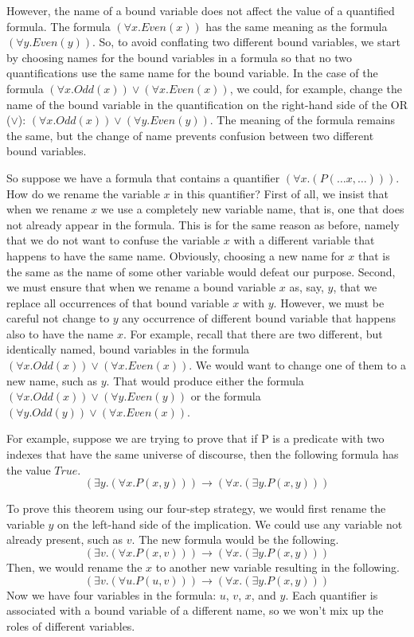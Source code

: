 {However, the name of a bound variable does not affect the value
of a quantified formula.
The formula $(\forall x.Even(x))$ has the same meaning
as the formula $(\forall y.Even(y))$.
So, to avoid conflating two different bound variables,
we start by choosing names for the bound variables in a formula
so that no two quantifications use the same name for the bound variable.
In the case of the formula
$(\forall x.Odd(x)) \vee (\forall x.Even(x))$,
we could, for example, change the name of the bound variable
in the quantification on the right-hand side of the OR ($\vee$):
$(\forall x.Odd(x)) \vee (\forall y.Even(y))$.
The meaning of the formula remains the same,
but the change of name prevents confusion between two different bound variables.

So suppose we have a formula that contains
a quantifier $(\forall x.(P(\dots x, \dots)))$.
How do we rename the variable $x$ in this quantifier?
First of all, we insist that when we rename $x$ we use a completely new variable name,
that is, one that does
not already appear in the formula.
This is for the same reason as before, namely that we do not want to confuse the variable
$x$ with a different variable that happens to have the same name.
Obviously, choosing a new name for $x$ that is the same as the name
of some other variable would defeat our purpose.
Second, we must ensure that when we rename a bound variable $x$ as, say,
$y$, that we replace all occurrences of that bound variable $x$ with $y$.
However, we must be careful not change to $y$ any occurrence of different bound variable
that happens also to have the name $x$.
For example, recall that there are two different, but identically named,
bound variables in the formula
$(\forall x.Odd(x)) \vee (\forall x.Even(x))$.
We would want to change one of them to a new name, such as $y$.
That would produce either the formula
$(\forall x.Odd(x)) \vee (\forall y.Even(y))$ or the formula
$(\forall y.Odd(y)) \vee (\forall x.Even(x))$.

For example, suppose we are trying to prove that
if P is a predicate with two indexes
that have the same universe of discourse,
then the following formula has the value $True$.
$$(\exists y. (\forall x. P(x, y))) \rightarrow (\forall x. (\exists y. P(x, y)))$$

To prove this theorem using our four-step strategy,
we would first rename the variable $y$ on the left-hand side of the implication.
We could use any variable not already present, such as $v$.
The new formula would be the following.
$$(\exists v. (\forall x. P(x, v))) \rightarrow (\forall x. (\exists y. P(x, y)))$$
Then, we would rename the $x$ to another new variable resulting in the following.
$$(\exists v. (\forall u. P(u, v))) \rightarrow (\forall x. (\exists y. P(x, y)))$$
Now we have four variables in the formula: $u$, $v$, $x$, and $y$.
Each quantifier is associated with a bound variable of a different name,
so we won't mix up the roles of different variables.

}
